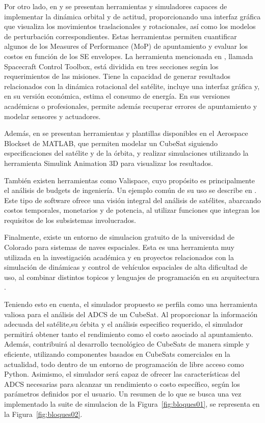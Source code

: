 Por otro lado, en \cite{ref18} y \cite{ref19} se presentan herramientas y simuladores capaces de implementar la dinámica orbital y de actitud, proporcionando una interfaz gráfica que visualiza los movimientos traslacionales y rotacionales, así como los modelos de perturbación correspondientes. Estas herramientas permiten cuantificar algunos de los Measures of Performance (MoP) de apuntamiento y evaluar los costos en función de los SE envelopes. La herramienta mencionada en \cite{ref18}, llamada Spacecraft Control Toolbox, está dividida en tres secciones según los requerimientos de las misiones. Tiene la capacidad de generar resultados relacionados con la dinámica rotacional del satélite, incluye una interfaz gráfica y, en su versión económica, estima el consumo de energía. En sus versiones académicas o profesionales, permite además recuperar errores de apuntamiento y modelar sensores y actuadores.

Además, en \cite{ref19} se presentan herramientas y plantillas disponibles en el Aerospace Blockset de MATLAB, que permiten modelar un CubeSat siguiendo especificaciones del satélite y de la órbita, y realizar simulaciones utilizando la herramienta Simulink Animation 3D para visualizar los resultados.

También existen herramientas como Valispace, cuyo propósito es principalmente el análisis de budgets de ingeniería. Un ejemplo común de su uso se describe en \cite{ref20}. Este tipo de software ofrece una visión integral del análisis de satélites, abarcando costos temporales, monetarios y de potencia, al utilizar funciones que integran los requisitos de los subsistemas involucrados.

Finalmente, existe un entorno de simulacion gratuito de la universidad de Colorado para sistemas de naves espaciales. Esta es una herramienta muy utilizada en la investigación académica y en proyectos relacionados con la simulación de dinámicas y control de vehículos espaciales de alta dificultad de uso, al combinar distintos topicos y lenguajes de programación en su arquitectura \cite{ref36}.

Teniendo esto en cuenta, el simulador propuesto se perfila como una herramienta valiosa para el análisis del ADCS de un CubeSat. Al proporcionar la información adecuada del satélite,su órbita y el análisis especifico requerido, el simulador permitirá obtener tanto el rendimiento como el costo asociado al apuntamiento. Además, contribuirá al desarrollo tecnológico de CubeSats de manera simple y eficiente, utilizando componentes basados en CubeSats comerciales en la actualidad, todo dentro de un entorno de programación de libre acceso como Python. Asimismo, el simulador será capaz de ofrecer las características del ADCS necesarias para alcanzar un rendimiento o costo específico, según los parámetros definidos por el usuario. Un resumen de lo que se busca una vez implementado la suite de simulacion de la Figura~\ref{fig:bloques01}, se representa en la Figura~\ref{fig:bloques02}.

